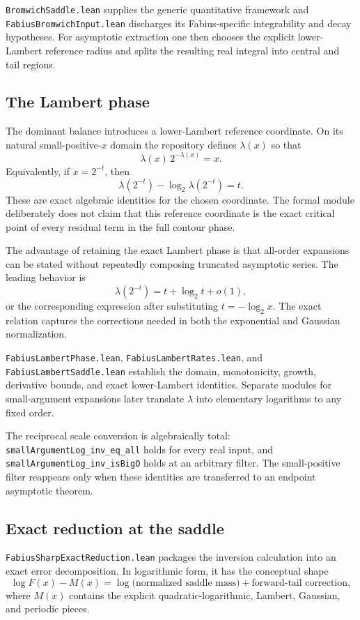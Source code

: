\documentclass[11pt,oneside]{article}
\theoremstyle{definition}
\theoremstyle{remark}
\begin{document}
\nolinkurl{BromwichSaddle.lean} supplies the generic quantitative framework and
\nolinkurl{FabiusBromwichInput.lean} discharges its Fabius-specific integrability
and decay hypotheses.  For asymptotic extraction one then chooses the
explicit lower-Lambert reference radius and splits the resulting real
integral into central and tail regions.

\subsection{The Lambert phase}
The dominant balance introduces a lower-Lambert reference coordinate.  On its natural small-positive-\(x\) domain the repository defines \(\lambda(x)\) so that
\[
  \lambda(x)\,2^{-\lambda(x)}=x.
\]
Equivalently, if \(x=2^{-t}\), then
\[
  \lambda(2^{-t})-\log_2\!\lambda(2^{-t})=t.
\]
These are exact algebraic identities for the chosen coordinate.  The formal module deliberately does not claim that this reference coordinate is the exact critical point of every residual term in the full contour phase.

The advantage of retaining the exact Lambert phase is that all-order expansions can be stated without repeatedly composing truncated asymptotic series.  The leading behavior is
\[
  \lambda(2^{-t})=t+\log_2 t+o(1),
\]
or the corresponding expression after substituting \(t=-\log_2x\).  The exact relation captures the corrections needed in both the exponential and Gaussian normalization.

\nolinkurl{FabiusLambertPhase.lean}, \nolinkurl{FabiusLambertRates.lean}, and \nolinkurl{FabiusLambertSaddle.lean} establish the domain, monotonicity, growth, derivative bounds, and exact lower-Lambert identities.  Separate modules for small-argument expansions later translate \(\lambda\) into elementary logarithms to any fixed order.

The reciprocal scale conversion is algebraically total:
\nolinkurl{smallArgumentLog_inv_eq_all} holds for every real input, and
\nolinkurl{smallArgumentLog_inv_isBigO} holds at an arbitrary filter.  The
small-positive filter reappears only when these identities are transferred to
an endpoint asymptotic theorem.

\subsection{Exact reduction at the saddle}
\nolinkurl{FabiusSharpExactReduction.lean} packages the inversion calculation into an exact error decomposition.  In logarithmic form, it has the conceptual shape
\[
  \log F(x)-M(x)
  =\log\bigl(\text{normalized saddle mass}\bigr)
   +\text{forward-tail correction},
\]
where \(M(x)\) contains the explicit quadratic-logarithmic, Lambert, Gaussian, and periodic pieces.
\end{document}
